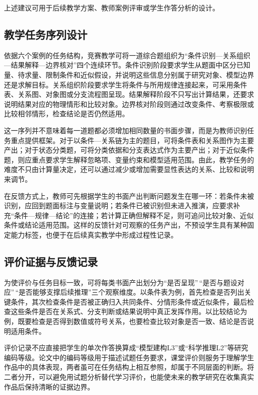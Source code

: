 \documentclass[
  12pt,
  a4paper,twoside,openany]{ctexbook}
\begin{document}
上述建议可用于后续教学方案、教师案例评审或学生作答分析的设计。

\subsection{教学任务序列设计}\label{ux6559ux5b66ux4efbux52a1ux5e8fux5217ux8bbeux8ba1}

依据六个案例的任务结构，竞赛教学可将一道综合题组织为``条件识别---关系组织---结果解释---边界核对''四个连续环节。条件识别阶段要求学生从题面中区分已知量、待求量、限制条件和近似假设，并说明这些信息分别属于研究对象、模型边界还是求解目标。关系组织阶段要求学生将条件与所用规律连接起来，可采用条件表、关系图、对象图或分支流程图呈现。结果解释阶段不只写出计算结果，还要求说明结果对应的物理情形和比较对象。边界核对阶段则通过改变条件、考察极限或比较相邻情形，检查结论是否仍然适用。

这一序列并不意味着每一道题都必须增加相同数量的书面步骤，而是为教师识别任务重点提供框架。对于以条件---关系链为主的题目，可将条件表和关系图作为主要产出；对于状态分类题，可将分类依据和分支表达式作为主要产出；对于近似条件题，则应重点要求学生解释忽略项、变量约束和模型适用范围。由此，教学任务的难度不只由计算量决定，还可以通过减少或增加需要显性表达的关系、比较和说明来调节。

在反馈方式上，教师可先根据学生的书面产出判断问题发生在哪一环：若条件未被识别，应回到题面标注与变量说明；若条件已被识别但未进入推演，应要求补充``条件---规律---结论''的连接；若计算正确但解释不足，则可追问比较对象、近似条件或结论适用范围。这样的反馈针对可观察的任务产出，不预设学生具有某种固定能力标签，也便于在后续真实教学中形成过程性记录。

\subsection{评价证据与反馈记录}\label{ux8bc4ux4ef7ux8bc1ux636eux4e0eux53cdux9988ux8bb0ux5f55}

为使评价与任务目标一致，可将每类书面产出划分为``是否呈现''\,``是否与题设对应''\,``是否能够支撑后续推理''三个观察维度。以条件表为例，首先检查是否列出关键条件，其次检查条件是否被正确归入共同条件、分情形条件或近似条件，最后检查这些条件是否在关系式、分支判断或结果说明中真正发挥作用。以比较结论为例，既要检查是否得到数值或符号关系，也要检查比较对象是否一致、结论是否说明适用条件。

评价记录不应直接把学生的单次作答换算成``模型建构L3''或``科学推理L2''等研究编码等级。论文中的编码等级用于描述试题任务要求，课堂评价则服务于理解学生作品中的具体表现，两者虽可在任务结构上相互参照，却属于不同层面的判断。将二者分开，可以避免用试题分析替代学习评价，也能使未来的教学研究在收集真实作品后保持清晰的证据边界。
\end{document}
